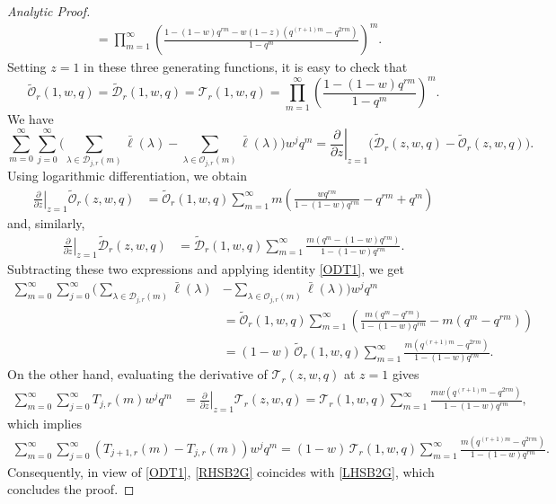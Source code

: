 \documentclass[10pt,a4paper]{amsart}
\def\del{\partial}
\begin{document}
\begin{proof}[Analytic Proof]
\begin{align*}
&=\prod_{m=1}^{\infty}\left(\frac{1-(1-w)q^{rm}-w(1-z)(q^{(r+1)m}-q^{2rm})}{1-q^{m}}\right)^m.
\end{align*} 
Setting $z=1$ in these three generating functions, it is easy to check that  
\begin{equation}\label{ODT1}
\widetilde{\mathcal O}_r(1,w,q)
=\widetilde{\mathcal D}_r(1,w,q)
={\mathcal T}_r(1,w,q)
=\prod_{m=1}^{\infty}\left(\frac{1-(1-w)q^{rm}}{1-q^{m}}\right)^m.
\end{equation}
We have 
$$\sum_{m=0}^\infty\sum_{j=0}^\infty \Big(\sum_{\lambda\in\mathcal{D}_{j,r}(m)}\bar{\ell}(\lambda)-
\sum_{\lambda\in\mathcal{O}_{j,r}(m)}\bar{\ell}(\lambda)\Big)w^jq^m 
= \left.\frac{\del}{\del z}\right|_{z=1}\!\!\!\!\!\!\bigl(\widetilde{\mathcal D}_r(z,w,q)-\widetilde{\mathcal O}_r(z,w,q)\bigr).$$
Using logarithmic differentiation, we obtain
\begin{align*}\left.\frac{\del}{\del z}\right|_{z=1}\!\!\!\!\!\!\widetilde{\mathcal O}_r(z,w,q)
&=\widetilde{\mathcal O}_r(1,w,q)\sum_{m=1}^\infty m\left(
\frac{wq^{rm}}{1-(1-w)q^{rm}}-q^{rm}+q^{m}\right)
\end{align*}
and, similarly,
\begin{align*}
\left.\frac{\del}{\del z}\right|_{z=1}\!\!\!\!\!\!\widetilde{\mathcal D}_r(z,w,q)
&= \widetilde{\mathcal D}_r(1,w,q)
\sum_{m=1}^\infty \frac{m(q^m-(1-w)q^{rm})}{1-(1-w)q^{rm}}.
\end{align*}
Subtracting these two expressions and applying identity \eqref{ODT1}, we get
\begin{align}\label{RHSB2G}
\sum_{m=0}^\infty\sum_{j=0}^\infty \Big(\sum_{\lambda\in\mathcal{D}_{j,r}(m)}\bar{\ell}(\lambda)&-
\sum_{\lambda\in\mathcal{O}_{j,r}(m)}\bar{\ell}(\lambda)\Big)w^jq^m\nonumber\\
&=\widetilde{\mathcal O}_r(1,w,q)
\sum_{m=1}^{\infty} 
\left(\frac{m(q^m-q^{rm})}{1-(1-w)q^{rm}}-m(q^m-q^{rm})\right)\nonumber\\
&=(1-w)\,\widetilde{\mathcal O}_r(1,w,q)
\sum_{m=1}^\infty \frac{m(q^{(r+1)m}-q^{2rm})}{1-(1-w)q^{rm}}.
\end{align}
On the other hand, evaluating the derivative of ${\mathcal T}_r(z,w,q)$ at $z=1$ gives
\begin{align*}
\sum_{m=0}^\infty\sum_{j=0}^\infty T_{j,r}(m)w^jq^m
&=\left.\frac{\del}{\del z}\right|_{z=1}\!\!\!\!\!\!{\mathcal T}_r(z,w,q)={\mathcal T}_r(1,w,q)
\sum_{m=1}^{\infty}\frac{mw(q^{(r+1)m}-q^{2rm})}{1-(1-w)q^{rm}},
\end{align*}
which implies 
\begin{align}\label{LHSB2G}
\sum_{m=0}^\infty\sum_{j=0}^{\infty} ({T}_{j+1,r}(m)-{T}_{j,r}(m)) w^jq^m=(1-w)\,{\mathcal T}_r(1,w,q)
\sum_{m=1}^\infty \frac{m(q^{(r+1)m}-q^{2rm})}{1-(1-w)q^{rm}}.
\end{align}
Consequently, in view of \eqref{ODT1}, \eqref{RHSB2G} coincides with \eqref{LHSB2G}, which concludes the proof.
\end{proof}
\end{document}
